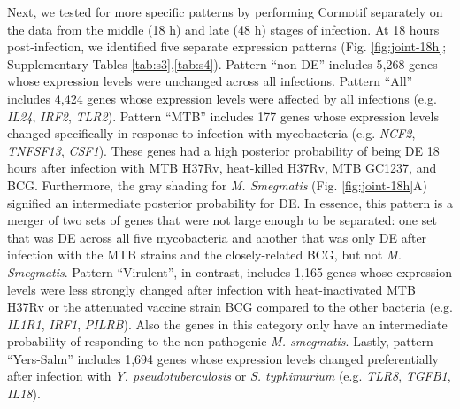 Next, we tested for more specific patterns by performing Cormotif
separately on the data from the middle (18 h) and late (48 h) stages of
infection. At 18 hours post-infection, we identified five separate
expression patterns (Fig. \ref{fig:joint-18h}; Supplementary Tables \ref{tab:s3},\ref{tab:s4}). Pattern
``non-DE'' includes 5,268 genes whose expression levels were unchanged
across all infections. Pattern ``All'' includes 4,424 genes whose
expression levels were affected by all infections (e.g. \emph{IL24},
\emph{IRF2}, \emph{TLR2}). Pattern ``MTB'' includes 177 genes whose
expression levels changed specifically in response to infection with
mycobacteria (e.g. \emph{NCF2}, \emph{TNFSF13}, \emph{CSF1}). These
genes had a high posterior probability of being DE 18 hours after
infection with MTB H37Rv, heat-killed H37Rv, MTB GC1237, and BCG.
Furthermore, the gray shading for \emph{M. Smegmatis} (Fig. \ref{fig:joint-18h}A)
signified an intermediate posterior probability for DE. In essence, this
pattern is a merger of two sets of genes that were not large enough to
be separated: one set that was DE across all five mycobacteria and
another that was only DE after infection with the MTB strains and the
closely-related BCG, but not \emph{M. Smegmatis}. Pattern ``Virulent'',
in contrast, includes 1,165 genes whose expression levels were less
strongly changed after infection with heat-inactivated MTB H37Rv or the
attenuated vaccine strain BCG compared to the other bacteria (e.g.
\emph{IL1R1}, \emph{IRF1}, \emph{PILRB}). Also the genes in this
category only have an intermediate probability of responding to the
non-pathogenic \emph{M. smegmatis}. Lastly, pattern ``Yers-Salm''
includes 1,694 genes whose expression levels changed preferentially
after infection with \emph{Y. pseudotuberculosis} or \emph{S.
typhimurium} (e.g. \emph{TLR8}, \emph{TGFB1}, \emph{IL18}).

